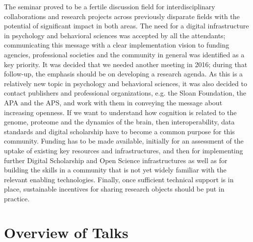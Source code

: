 \documentclass[a4paper,USenglish]{dagrep}
\begin{document}
The seminar proved to be a fertile discussion field for interdisciplinary
collaborations and research projects across previously disparate fields with the
potential of significant impact in both areas. The need for a digital
infrastructure in psychology and behavioral sciences was accepted by all the
attendants; communicating this message with a clear implementation vision to
funding agencies, professional societies and the community in general was
identified as a key priority. It was decided that we needed another meeting in
2016; during that follow-up, the emphasis should be on developing a research
agenda. As this is a relatively new topic in psychology and behavioral sciences,
it was also decided to contact publishers and professional organizations, e.g.
the Sloan Foundation, the APA and the APS, and work with them in conveying the
message about increasing openness. If we want to understand how cognition is
related to the genome, proteome and the dynamics of the brain, then
interoperability, data standards and digital scholarship have to become a common
purpose for this community. Funding has to be made available, initially for an
assessment of the uptake of existing key resources and infrastructures, and then
for implementing further Digital Scholarship and Open Science infrastructures as
well as for building the skills in a community that is not yet widely familiar
with the relevant enabling technologies. Finally, once sufficient technical
support is in place, sustainable incentives for sharing research objects should
be put in practice.

\tableofcontents

\section{Overview of Talks}
\end{document}
